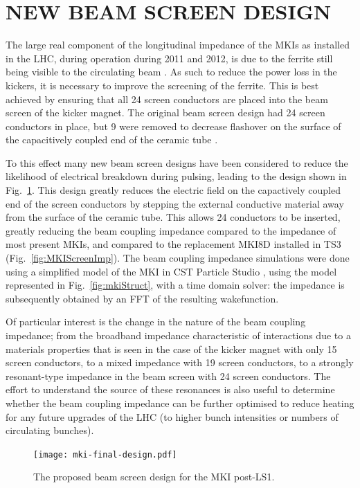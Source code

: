 \documentclass{JAC2003}
\begin{document}
\section{NEW BEAM SCREEN DESIGN}

The large real component of the longitudinal impedance of the MKIs as installed in the LHC, during operation during 2011 and 2012, is due to the ferrite still being visible to the circulating beam \cite{kicker_meas}. As such to reduce the power loss in the kickers, it is necessary to improve the screening of the ferrite. This is best achieved by ensuring that all 24 screen conductors are placed into the beam screen of the kicker magnet. The original beam screen design had 24 screen conductors in place, but 9 were removed to decrease flashover on the surface of the capacitively coupled end of the ceramic tube \cite{mki-ElecBreakdown}. 

To this effect many new beam screen designs have been considered to reduce the likelihood of electrical breakdown during pulsing, leading to the design shown in Fig.~\ref{fig:newScreenDesign}. This design greatly reduces the electric field on the capactively coupled end of the screen conductors by stepping the external conductive material away from the surface of the ceramic tube. This allows 24 conductors to be inserted, greatly reducing the beam coupling impedance compared to the impedance of most present MKIs, and compared to the replacement MKI8D installed in TS3 (Fig.~\ref{fig:MKIScreenImp}). The beam coupling impedance simulations were done using a simplified model of the MKI in CST Particle Studio \cite{cst-cite}, using the model represented in Fig.~\ref{fig:mkiStruct}, with a time domain solver: the impedance is subsequently obtained by an FFT of the resulting wakefunction. 

Of particular interest is the change in the nature of the beam coupling impedance; from the broadband impedance characteristic of interactions due to a materials properties that is seen in the case of the kicker magnet with only 15 screen conductors, to a mixed impedance with 19 screen conductors, to a strongly resonant-type impedance in the beam screen with 24 screen conductors. The effort to understand the source of these resonances is also useful to determine whether the beam coupling impedance can be further optimised to reduce heating for any future upgrades of the LHC (to higher bunch intensities or numbers of circulating bunches).

\begin{figure}
\texttt{[image: mki-final-design.pdf]}
\caption{The proposed beam screen design for the MKI post-LS1.}
\label{fig:newScreenDesign}
\end{figure}
\end{document}
